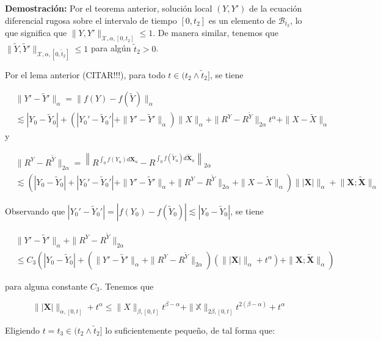 \textbf{Demostración:} Por el teorema anterior, solución local $(Y, Y')$ de la ecuación diferencial rugosa sobre el intervalo de tiempo $[0, t_2]$ es un elemento de $\mathcal{B}_{t_2}$, lo que significa que $\| Y, Y' \|_{\mathcal{X}, \alpha, [0, t_2]} \leq 1$. De manera similar, tenemos que $\| \tilde{Y}, \tilde{Y}' \|_{\mathcal{X}, \alpha, [0, \tilde{t}_2]} \leq 1$ para algún $\tilde{t}_2 > 0$.

Por el lema anterior (CITAR!!!), para todo $t \in (t_2 \wedge \tilde{t}_2]$, se tiene

\begin{align*}
	&\| Y' - \tilde{Y}' \|_{\alpha} = \| f(Y) - f(\tilde{Y}) \|_{\alpha} \\ 
	& \lesssim  | Y_0 - \tilde{Y}_0 | + ( | Y_0' - \tilde{Y}_0' | + \| Y' - \tilde{Y}' \|_{\alpha} ) \| X \|_{\alpha} + \| R^Y - R^{\tilde{Y}} \|_{2\alpha} t^{\alpha} + \| X - \tilde{X} \|_{\alpha}
\end{align*}
y

\begin{align*}
	&\| R^Y - R^{\tilde{Y}} \|_{2\alpha} = \left\| R^{ \int_0^{\cdot} f(Y_u)  d\mathbf{X}_u} -  R^{ \int_0^{\cdot} f( \tilde{Y}_u ) d\mathbf{ \tilde{X} }_u } \right\|_{2\alpha} \\
	& \lesssim ( |Y_0 - \tilde{Y}_0| + | Y_0' - \tilde{Y}_0' | + \| Y' - \tilde{Y}' \|_{\alpha} + \| R^Y - R^{\tilde{Y}} \|_{2\alpha} + \| X - \tilde{X} \|_{\alpha} ) \| | \mathbf{X} | \|_{\alpha} + \lVert \mathbf{X}; \mathbf{ \tilde{X} } \rVert_{\alpha}
\end{align*}

Observando que $|Y_0' - \tilde{Y}_0'| = |f(Y_0) - f(\tilde{Y}_0)| \lesssim |Y_0 - \tilde{Y}_0|$, se tiene

\begin{align*}
	&\| Y' - \tilde{Y}' \|_{\alpha} + \| R^Y - R^{\tilde{Y}} \|_{2\alpha}\\
	&\leq C_3 \left( |Y_0 - \tilde{Y}_0| + (\| Y' - \tilde{Y}' \|_{\alpha} + \| R^Y - R^{\tilde{Y}} \|_{2\alpha}) (\| | \mathbf{X} | \|_{\alpha} + t^{\alpha}) + \| \mathbf{X}; \tilde{\mathbf{X}} \|_{\alpha} \right)
\end{align*}

para alguna constante $C_3$. Tenemos que

\[
\| | \mathbf{X} | \|_{\alpha, [0,t]} + t^{\alpha} \leq \| X \|_{\beta, [0,t]} t^{\beta - \alpha} + \| \mathbb{X} \|_{2\beta, [0,t]} t^{2(\beta - \alpha)} + t^{\alpha}
\]

Eligiendo $t = t_3 \in (t_2 \wedge \tilde{t}_2]$ lo suficientemente pequeño, de tal forma que: 

